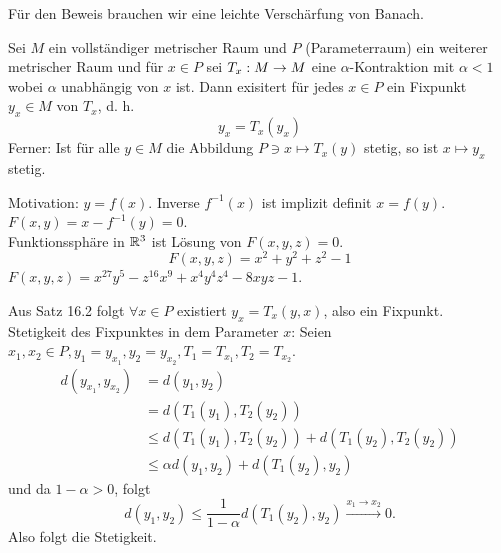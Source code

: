 \documentclass[../ana2.tex]{subfiles}
\begin{document}
Für den Beweis brauchen wir eine leichte Verschärfung von
Banach.
\begin{lem}
    Sei \( M \) ein vollständiger metrischer Raum und \( P \) 
    (Parameterraum) ein weiterer metrischer Raum und für \( x\in P \)     
    sei \(T_x:M\rightarrow M\) eine \(\alpha\)-Kontraktion mit \(\alpha < 1\)
    wobei \(\alpha\) unabhängig von \(x\) ist. Dann exisitert für jedes \(x \in P\)
    ein Fixpunkt \(y_x \in M\) von \(T_x\), d. h. 
    \[ y_x = T_x(y_x) \]
    Ferner: Ist für alle \(y \in M\) die Abbildung 
    \(P \ni x \mapsto T_x(y)\) stetig, so ist
    \( x \mapsto y_x \) stetig.
\end{lem}
Motivation:
\( y = f(x) \). Inverse \( f^{-1}(x) \) ist implizit definit 
\( x = f(y) \). \( F(x,y) = x - f^{-1}(y) = 0 \).\\
Funktionssphäre in \( \mathbb{R}^3 \) ist Lösung von 
\( F(x,y,z) = 0 \).
\[ F(x,y,z) = x^2 + y^2 + z^2 - 1 \]
\( F(x,y,z) = x^{27}y^5 - z^{16}x^9 + x^4 y^4 z^4 - 8xyz - 1 \).
\begin{bew}
    Aus Satz 16.2 folgt \( \forall x \in P \) 
    existiert \( y_x = T_x(y,x) \), also ein Fixpunkt.\\
    Stetigkeit des Fixpunktes in dem Parameter \( x \): 
    Seien \( x_1, x_2 \in P, y_1 = y_{x_1}, y_2 = y_{x_2}, 
    T_1 = T_{x_1}, T_2 = T_{x_2} \).
    \begin{align*}
        d(y_{x_1}, y_{x_2}) &= d(y_1, y_2) \\
        &= d(T_1(y_1), T_2(y_2)) \\
        &\leq d(T_1(y_1), T_2(y_2)) + d(T_1(y_2), T_2(y_2)) \\
        &\leq \alpha d(y_1, y_2) + d(T_1(y_2), y_2)
    \end{align*}
    und da \( 1-\alpha > 0 \), folgt 
    \[ d(y_1, y_2) \leq \frac{1}{1-\alpha} d(T_1(y_2),y_2) 
    \overset{x_1 \rightarrow x_2}{\longrightarrow} 0. \]
    Also folgt die Stetigkeit.
\end{bew}
\end{document}
